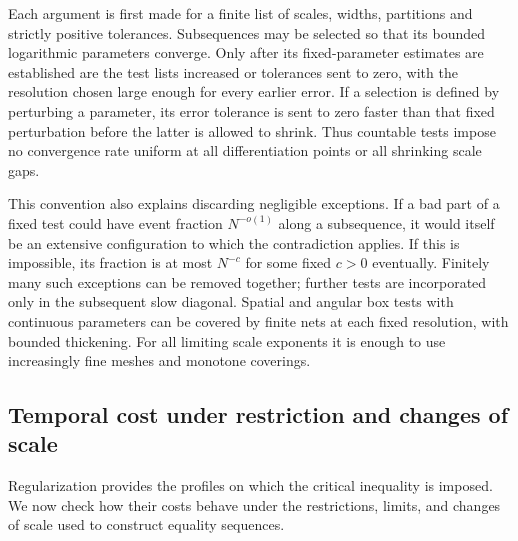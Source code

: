 \begin{convention}\label{conv:slow-diagonal}
Each argument is first made for a finite list of scales, widths, partitions
and strictly positive tolerances.  Subsequences may be selected so that its
bounded logarithmic parameters converge.  Only after its fixed-parameter
estimates are established are the test lists increased or tolerances sent
to zero, with the resolution chosen large enough for every earlier error.
If a selection is defined by perturbing a parameter, its error tolerance is
sent to zero faster than that fixed perturbation before the latter is
allowed to shrink.  Thus countable tests impose no convergence rate
uniform at all differentiation points or all shrinking scale gaps.
\end{convention}

This convention also explains discarding negligible exceptions.  If a bad
part of a fixed test could have event fraction $N^{-o(1)}$ along a
subsequence, it would itself be an extensive configuration to which the
contradiction applies.  If this is impossible, its fraction is at most
$N^{-c}$ for some fixed $c>0$ eventually.  Finitely many such exceptions can
be removed together; further tests are incorporated only in the subsequent
slow diagonal.  Spatial and angular box tests with continuous parameters
can be covered by finite nets at each fixed resolution, with bounded
thickening.  For all limiting scale exponents it is enough to use increasingly
fine meshes and monotone coverings.

\subsection{Temporal cost under restriction and changes of scale}

Regularization provides the profiles on which the critical inequality is
imposed. We now check how their costs behave under the restrictions,
limits, and changes of scale used to construct equality sequences.

